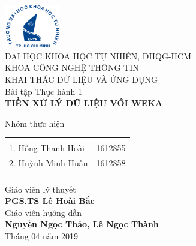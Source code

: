 \begin{titlepage}

\begin{center}

\includegraphics[width=0.18\textwidth]{hcmus.png}\\[0.1in]
\large{ĐẠI HỌC KHOA HỌC TỰ NHIÊN, ĐHQG-HCM\\KHOA CÔNG NGHỆ THÔNG TIN}\\
\normalsize
\vspace{4cm}
\textup{\large {KHAI THÁC DỮ LIỆU VÀ ỨNG DỤNG} \\ \Large Bài tập Thực hành 1}\\[0.2in]

\huge \textbf {TIỀN XỬ LÝ DỮ LIỆU VỚI WEKA}\\[0.5in]
\vspace{4cm}



\normalsize Nhóm thực hiện \\
\begin{table}[h]
\centering
\begin{tabular}{lr}\hline \\
1. Hồng Thanh Hoài & 1612855\\ 
2. Huỳnh Minh Huấn & 1612858\\ \\ \hline
\end{tabular}
\end{table}

\vspace{.2in}
Giáo viên lý thuyết\\
{\textbf{PGS.TS Lê Hoài Bắc}}\\[0.1in]
Giáo viên hướng dẫn\\
{\textbf{Nguyễn Ngọc Thảo, Lê Ngọc Thành}}\\[0.2in]

\vfill
Tháng 04 năm 2019

\end{center}

\end{titlepage}
\newpage
